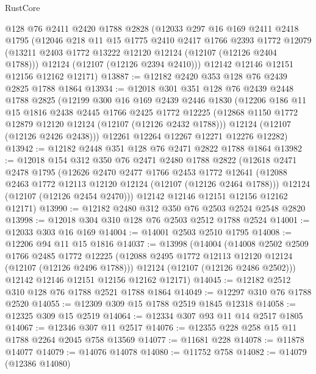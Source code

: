 \begin{lexlean}{RustCore}
\begin{coremodule}
    @128
    @76
    @2411
    @2420
    @1788
    @2828
    (@12033
      @297
      @16
      @169
      @2411
      @2418
      @1795
      (@12046
        @218
        @11
        @15
        @1775
        @2410
        @2417
        @1766
        @2393
        @1772
        @12079
        (@13211 @2403 @1772 @13222 @12120 @12124 (@12107 (@12126 @2404 @1788)))
        @12124
        (@12107 (@12126 @2394 @2410)))
      @12142
      @12146
      @12151
      @12156
      @12162
      @12171)
@13887 := @12182 @2420 @353 @128 @76 @2439 @2825 @1788 @1864
@13934 := @12018
    @301
    @351
    @128
    @76
    @2439
    @2448
    @1788
    @2825
    (@12199
      @300
      @16
      @169
      @2439
      @2446
      @1830
      (@12206
        @186
        @11
        @15
        @1816
        @2438
        @2445
        @1766
        @2425
        @1772
        @12225
        (@12868 @1150 @1772 @12879 @12120 @12124 (@12107 (@12126 @2432 @1788)))
        @12124
        (@12107 (@12126 @2426 @2438)))
      @12261
      @12264
      @12267
      @12271
      @12276
      @12282)
@13942 := @12182 @2448 @351 @128 @76 @2471 @2822 @1788 @1864
@13982 := @12018
    @154
    @312
    @350
    @76
    @2471
    @2480
    @1788
    @2822
    (@12618
      @2471
      @2478
      @1795
      (@12626
        @2470
        @2477
        @1766
        @2453
        @1772
        @12641
        (@12088 @2463 @1772 @12113 @12120 @12124 (@12107 (@12126 @2464 @1788)))
        @12124
        (@12107 (@12126 @2454 @2470)))
      @12142
      @12146
      @12151
      @12156
      @12162
      @12171)
@13990 := @12182 @2480 @312 @350 @76 @2503 @2524 @2548 @2820
@13998 := @12018 @304 @310 @128 @76 @2503 @2512 @1788 @2524
@14001 := @12033 @303 @16 @169
@14004 := @14001 @2503 @2510 @1795
@14008 := @12206 @94 @11 @15 @1816
@14037 := @13998
    (@14004
      (@14008
        @2502
        @2509
        @1766
        @2485
        @1772
        @12225
        (@12088 @2495 @1772 @12113 @12120 @12124 (@12107 (@12126 @2496 @1788)))
        @12124
        (@12107 (@12126 @2486 @2502)))
      @12142
      @12146
      @12151
      @12156
      @12162
      @12171)
@14045 := @12182 @2512 @310 @128 @76 @1788 @2521 @1788 @1864
@14049 := @12297 @310 @76 @1788 @2520
@14055 := @12309 @309 @15 @1788 @2519 @1845 @12318
@14058 := @12325 @309 @15 @2519
@14064 := @12334 @307 @93 @11 @14 @2517 @1805
@14067 := @12346 @307 @11 @2517
@14076 := @12355 @228 @258 @15 @11 @1788 @2264 @2045 @758 @13569
@14077 := @11681 @228
@14078 := @11878 @14077
@14079 := @14076 @14078
@14080 := @11752 @758
@14082 := @14079 (@12386 @14080)

\end{coremodule}
\end{lexlean}
